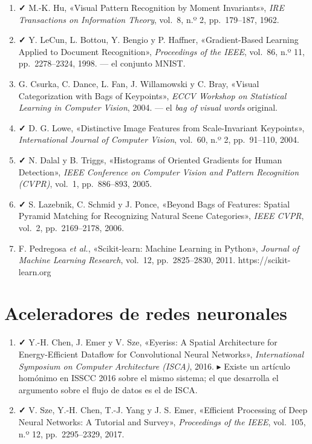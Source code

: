 \begin{enumerate}
\def\labelenumi{\arabic{enumi}.}
\setcounter{enumi}{28}
\tightlist
\item
  \textbf{✓} M.-K. Hu, «Visual Pattern Recognition by Moment
  Invariants», \emph{IRE Transactions on Information Theory}, vol.~8,
  n.º 2, pp.~179--187, 1962.
\item
  \textbf{✓} Y. LeCun, L. Bottou, Y. Bengio y P. Haffner,
  «Gradient-Based Learning Applied to Document Recognition»,
  \emph{Proceedings of the IEEE}, vol.~86, n.º 11, pp.~2278--2324, 1998.
  --- el conjunto MNIST.
\item
  G. Csurka, C. Dance, L. Fan, J. Willamowski y C. Bray, «Visual
  Categorization with Bags of Keypoints», \emph{ECCV Workshop on
  Statistical Learning in Computer Vision}, 2004. --- el \emph{bag of
  visual words} original.
\item
  \textbf{✓} D. G. Lowe, «Distinctive Image Features from
  Scale-Invariant Keypoints», \emph{International Journal of Computer
  Vision}, vol.~60, n.º 2, pp.~91--110, 2004.
\item
  \textbf{✓} N. Dalal y B. Triggs, «Histograms of Oriented Gradients for
  Human Detection», \emph{IEEE Conference on Computer Vision and Pattern
  Recognition (CVPR)}, vol.~1, pp.~886--893, 2005.
\item
  \textbf{✓} S. Lazebnik, C. Schmid y J. Ponce, «Beyond Bags of
  Features: Spatial Pyramid Matching for Recognizing Natural Scene
  Categories», \emph{IEEE CVPR}, vol.~2, pp.~2169--2178, 2006.
\item
  F. Pedregosa \emph{et al.}, «Scikit-learn: Machine Learning in
  Python», \emph{Journal of Machine Learning Research}, vol.~12,
  pp.~2825--2830, 2011. https://scikit-learn.org
\end{enumerate}

\section{Aceleradores de redes
neuronales}\label{aceleradores-de-redes-neuronales}

\begin{enumerate}
\def\labelenumi{\arabic{enumi}.}
\setcounter{enumi}{35}
\tightlist
\item
  \textbf{✓} Y.-H. Chen, J. Emer y V. Sze, «Eyeriss: A Spatial
  Architecture for Energy-Efficient Dataflow for Convolutional Neural
  Networks», \emph{International Symposium on Computer Architecture
  (ISCA)}, 2016. ▸ Existe un artículo homónimo en ISSCC 2016 sobre el
  mismo sistema; el que desarrolla el argumento sobre el flujo de datos
  es el de ISCA.
\item
  \textbf{✓} V. Sze, Y.-H. Chen, T.-J. Yang y J. S. Emer, «Efficient
  Processing of Deep Neural Networks: A Tutorial and Survey»,
  \emph{Proceedings of the IEEE}, vol.~105, n.º 12, pp.~2295--2329,
  2017.
\end{enumerate}

